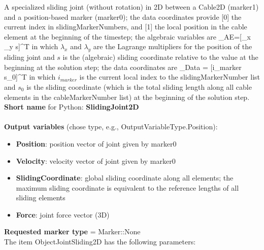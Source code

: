 A specialized sliding joint (without rotation) in 2D between a Cable2D (marker1) and a position-based marker (marker0); the data coordinates provide [0] the current index in slidingMarkerNumbers, and [1] the local position in the cable element at the beginning of the timestep; the algebraic variables are \be \qv_{AE}=[\lambda_x\;\; \lambda_y \;\; s]^T \ee in which $\lambda_x$ and $\lambda_y$ are the Lagrange multipliers for the position of the sliding joint and $s$ is the (algebraic) sliding coordinate relative to the value at the beginning at the solution step; the data coordinates are \be \qv_{Data} = [i_{marker} \;\; s_{0}]^T \ee in which $i_{marker}$ is the current local index to the slidingMarkerNumber list and  $s_{0}$ is the sliding coordinate (which is the total sliding length along all cable elements in the cableMarkerNumber list) at the beginning of the solution step.
 \\
{\bf Short name} for Python: {\bf SlidingJoint2D}
 \\\\ 
{\bf Output variables} (chose type, e.g., OutputVariableType.Position): 
\begin{itemize}
    \item {\bf Position}: position vector of joint given by marker0
    \item {\bf Velocity}: velocity vector of joint given by marker0
    \item {\bf SlidingCoordinate}: global sliding coordinate along all elements; the maximum sliding coordinate is equivalent to the reference lengths of all sliding elements
    \item {\bf Force}: joint force vector (3D)
\end{itemize}
  {\bf Requested marker type} = Marker::None \\ 
The item ObjectJointSliding2D has the following parameters:
